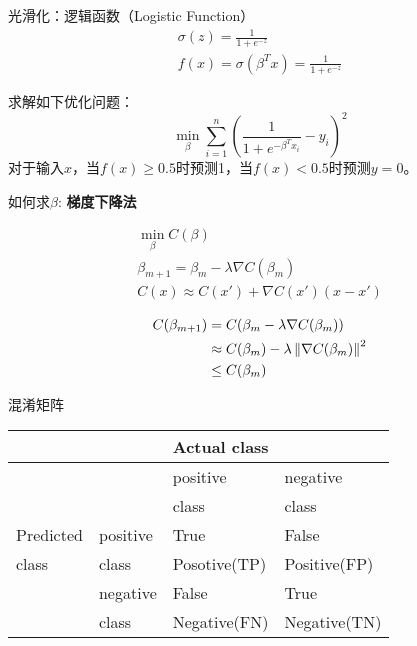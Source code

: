 \documentclass[11pt]{article}
\begin{document}
光滑化：逻辑函数（Logistic Function）
\begin{gather*}
\sigma(z)=\frac{1}{1+e^{-z}}\\
f(x)=\sigma(\beta^Tx)=\frac{1}{1+e^{-z}}
\end{gather*}

求解如下优化问题：
\begin{equation*}
\min_\beta\sum_{i=1}^n\left( \frac{1}{1+e^{-\beta^Tx_i}}-y_i \right)^2
\end{equation*}
对于输入\(x\)，当\(f(x)\ge 0.5\)时预测1，当\(f(x)<0.5\)时预测\(y=0\)。

如何求\(\beta\): \textbf{梯度下降法}

\begin{gather*}
\min_\beta C(\beta)\\
\beta_{m+1}=\beta_m-\lambda\nabla C(\beta_m)\\
C(x)\approx C(x')+\nabla C(x')(x-x')\\
\end{gather*}
\begin{align*}
C(\beta_{m+1})&=C(\beta_m-\lambda\nabla C(\beta_m))\\
&\approx C(\beta_m)-\lambda\left\lVert\nabla C(\beta_m)\right\rVert^2\\
&\le C(\beta_m)
\end{align*}

混淆矩阵
\begin{center}
\begin{tabular}{|l|l|l|l|}
\hline
 & & \multicolumn{2}{l|}{Actual class} \\
\hline
 & & positive & negative \\
 & & class & class \\
\hline
Predicted & positive & True & False \\
class & class & Posotive(TP) & Positive(FP) \\
\cline{2-4}
 & negative & False & True \\
 & class & Negative(FN) & Negative(TN) \\
\hline
\end{tabular}
\end{center}
\end{document}
